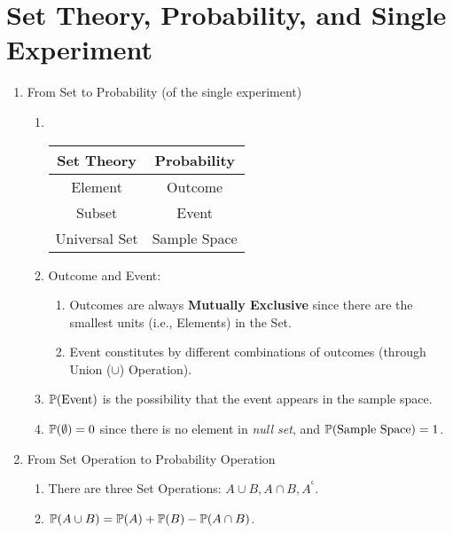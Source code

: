 \chapter{Set Theory, Probability, and Single Experiment}
\begin{enumerate}
    \item From Set to Probability (of the single experiment)
    \begin{enumerate}
        \item~{
            \begin{center}
                \begin{tabular}{|c|c|}
                    \hline
                    \textbf{Set Theory} & \textbf{Probability} \\
                    \hline
                    \hline
                    Element & Outcome \\
                    \hline
                    Subset  & Event   \\
                    \hline
                    Universal Set & Sample Space \\
                    \hline
                \end{tabular}
            \end{center}
                        }
            \item Outcome and Event: {
                \begin{enumerate}
                    \item Outcomes are always \textbf{Mutually Exclusive} since there are the smallest units (i.e., Elements) in the Set.
                    \item Event constitutes by different combinations of outcomes (through Union ($\cup$) Operation).
                \end{enumerate}
            } 
            \item $\P{\text{Event}}$ is the possibility that the event appears in the sample space. 
            \item $\P{\emptyset}=0$ since there is no element in \textit{null set}, and $\P{\text{Sample Space}}=1$.
    \end{enumerate}
    \item From Set Operation to Probability Operation
    \begin{enumerate}
        \item There are three Set Operations: $A \cup B, A \cap B, A^{^\mathsf{c}}$.
        \item $\P{A \cup B} = \P{A}+\P{B}-\P{A\cap B}$.

\end{enumerate}
\end{enumerate}

